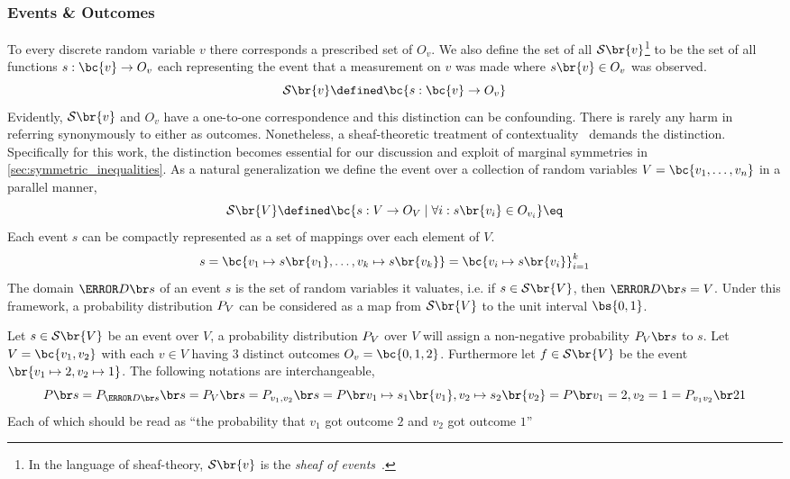 \documentclass[aps, 10pt, english, twoside, pra, nofootinbib, tightenlines, longbibliography]{revtex4-1}
\renewcommand{\Events}[1]{\mathcal{S}\br{#1}} %
\begin{document}
    \subsubsection{Events \& Outcomes}
    To every discrete random variable $v$ there corresponds a prescribed set of  $O_v$. We also define the set of all  $\Events{v}$\footnote{In the language of sheaf-theory, $\Events{v}$ is the \textit{sheaf of events}~\cite{Abramsky_2011}.} to be the set of all functions $s : \bc{v} \to O_v$ each representing the event that a measurement on $v$ was made where $s\br{v} \in O_v$ was observed.
    \[ \Events{v} \defined \bc{s : \bc{v} \to O_v} \]
    Evidently, $\Events{v}$ and $O_v$ have a one-to-one correspondence and this distinction can be confounding. There is rarely any harm in referring synonymously to either as outcomes. Nonetheless, a sheaf-theoretic treatment of contextuality~\cite{Abramsky_2011} demands the distinction.
    Specifically for this work, the distinction becomes essential for our discussion and exploit of marginal symmetries in \cref{sec:symmetric_inequalities}. As a natural generalization we define the event over a collection of random variables $V = \bc{v_1, \ldots, v_n}$ in a parallel manner,
    \[ \Events{V} \defined \bc{s: V \to O_{V} \mid \forall i : s\br{v_i} \in O_{v_i} } \eq \label{eq:outcome_space}\]
    Each event $s$ can be compactly represented as a set of mappings over each element of $V$.
    \[ s = \bc{v_1 \mapsto s\br{v_1}, \ldots, v_k \mapsto s\br{v_k}} = \bc{v_i\mapsto s\br{v_i}}_{i = 1}^{k} \]
    The domain $\Dom{s}$ of an event $s$ is the set of random variables it valuates, i.e. if $s \in \Events{V}$, then $\Dom{s} = V$. Under this framework, a probability distribution $\prob[V]$ can be considered as a map from $\Events{V}$ to the unit interval $\bs{0,1}$.
    \begin{example}
        Let $s \in \Events{V}$ be an event over $V$, a probability distribution $\prob[V]$ over $V$ will assign a non-negative probability $\prob[V][s]$ to $s$. Let $V = \bc{v_1, v_2}$ with each $v \in V$ having $3$ distinct outcomes $O_v = \bc{0,1,2}$. Furthermore let $f \in \Events{V}$ be the event $\br{v_1 \mapsto 2, v_2 \mapsto 1}$. The following notations are interchangeable,
        \[ \prob[][s] = \prob[\Dom{s}][s] = \prob[V][s] = \prob[v_1, v_2][s] = \prob[][v_1 \mapsto s_1\br{v_1}, v_2 \mapsto s_2\br{v_2}] = \prob[][v_1 = 2, v_2 = 1] = \prob[v_1v_2][21] \]
        Each of which should be read as ``the probability that $v_1$ got outcome $2$ and $v_2$ got outcome $1$''
    \end{example}
\end{document}

